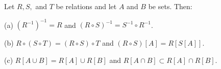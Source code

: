 Let $R, S,$ and $T$ be relations and let $A$ and $B$ be sets. Then:

(a) $(R^{-1})^{-1} = R$ and $(R \circ S)^{-1} = S^{-1} \circ R^{-1}$.

(b) $R \circ (S \circ T) = (R \circ S) \circ T$ and $(R \circ S)[A] = R[S[A]]$.

(c) $R[A \cup B] = R[A] \cup R[B]$ and $R[A \cap B] \subset R[A] \cap R[B]$.
